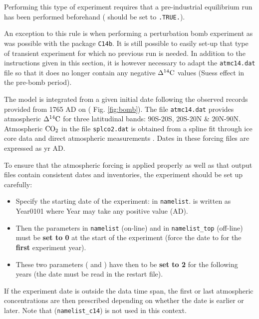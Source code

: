\documentclass[../main/TOP_manual]{subfiles}
\begin{document}
Performing this type of experiment requires that a pre-industrial equilibrium run has been performed beforehand ( should be set to \texttt{.TRUE.}).

An exception to this rule is when performing a perturbation bomb experiment as was possible with the package \texttt{C14b}.
It is still possible to easily set-up that type of transient experiment for which no previous run is needed.
In addition to the instructions given in this section, it is however necessary to adapt the \texttt{atmc14.dat} file so that it does no longer contain any negative $\Delta ^{14}\mathrm{C}$ values (Suess effect in the pre-bomb period).

The model  is integrated from a given initial date following the observed records provided from 1765 AD on ( Fig. \autoref{fig:bomb}).
The file \texttt{atmc14.dat}  \cite[][\& I.
Levin, personal comm.]{enting_1994} provides atmospheric $\Delta ^{14}\mathrm{C}$ for three latitudinal bands: 90S-20S,    20S-20N \&    20N-90N.
Atmospheric $\mathrm{CO_2}$ in the file \texttt{splco2.dat} is obtained from a spline fit through ice core data and direct atmospheric measurements \cite[][\& J.
Orr, personal comm.]{orr_2000}.
Dates in these forcing files are expressed as yr AD.

To ensure that the atmospheric forcing is applied properly as well as that output files contain consistent dates and inventories, the experiment should be set up carefully:

\begin{itemize}
\item Specify the starting date of the experiment:  in \texttt{namelist}.   is written as Year0101 where Year may take any positive value (AD).
\item Then the parameters  in  \texttt{namelist} (on-line) and  in \texttt{namelist\_top} (off-line)  must be \textbf{set to 0} at the start of the experiment (force the date to  for the \textbf{first} experiment year).
\item These two parameters ( and ) have then to be \textbf{set to 2} for the following years (the date must be read in the restart file).
\end{itemize}

If the experiment date is outside the data time span, the first or last atmospheric concentrations are then prescribed depending on whether the date is earlier or later.
	Note that  (\texttt{namelist\_c14}) is not used in this context.
\end{document}
